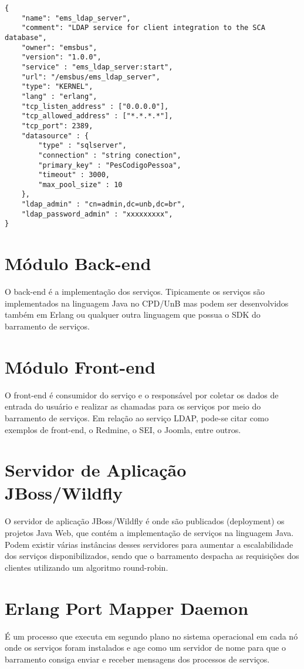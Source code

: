 \renewcommand{\lstlistingname}{Código}             
\begin{lstlisting}[caption=Contrato de serviço para o LDAP v3., label=fig:catalogo_processo] 
{
	"name": "ems_ldap_server",
	"comment": "LDAP service for client integration to the SCA database",
	"owner": "emsbus",
	"version": "1.0.0",
	"service" : "ems_ldap_server:start",
	"url": "/emsbus/ems_ldap_server",
	"type": "KERNEL",
	"lang" : "erlang",
	"tcp_listen_address" : ["0.0.0.0"],
	"tcp_allowed_address" : ["*.*.*.*"],
	"tcp_port": 2389,
	"datasource" : {
		"type" : "sqlserver",
		"connection" : "string conection",
		"primary_key" : "PesCodigoPessoa",
		"timeout" : 3000,
		"max_pool_size" : 10
	},	
	"ldap_admin" : "cn=admin,dc=unb,dc=br",
	"ldap_password_admin" : "xxxxxxxxx",
}
\end{lstlisting}


\section{Módulo Back-end}

O back-end é a implementação dos serviços. Tipicamente
os serviços são implementados na linguagem Java no CPD/UnB
mas podem ser desenvolvidos também em Erlang ou qualquer outra linguagem que possua 
o SDK do barramento de serviços. 


\section{Módulo Front-end}

O front-end é consumidor do serviço e o responsável por coletar os dados de entrada do usuário
e realizar as chamadas para os serviços por meio do barramento de serviços.
Em relação ao serviço LDAP, pode-se citar como exemplos de front-end, 
o Redmine, o SEI, o Joomla, entre outros.


\section{Servidor de Aplicação JBoss/Wildfly}

O servidor de aplicação JBoss/Wildfly é onde são publicados (deployment)
os projetos Java Web, que contém a implementação de serviços na linguagem Java. 
Podem existir várias instâncias desses servidores para
aumentar a escalabilidade dos serviços disponibilizados, 
sendo que o barramento despacha
as requisições dos clientes utilizando um algoritmo round-robin.

\section{Erlang Port Mapper Daemon}

É um processo que executa em 
segundo plano no sistema operacional em cada nó onde os serviços foram instalados e age 
como um servidor de nome para que o barramento consiga
enviar e receber mensagens dos processos de serviços.

